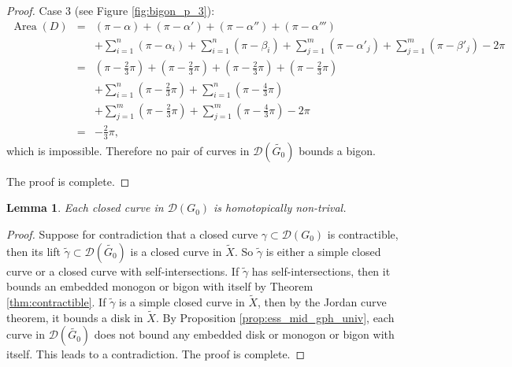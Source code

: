\documentclass[UTF8]{amsart}
\newtheorem{lemma}[theorem]{Lemma}
\numberwithin{equation}{section}
\theoremstyle{definition}
\theoremstyle{example}
\theoremstyle{remark}
\DeclareMathOperator{\area}{Area}
\begin{document}
\begin{proof}
	Case 3 (see Figure \ref{fig:bigon_p_3}):
	\begin{eqnarray*}
		\area(D) &=& (\pi-\alpha) + (\pi - \alpha') + (\pi - \alpha'') + (\pi - \alpha''') \\ 
			 & & + \sum_{i=1}^n ( \pi-\alpha_i ) + \sum_{i=1}^n ( \pi-\beta_i ) + \sum_{j=1}^m ( \pi-\alpha'_j ) + \sum_{j=1}^m ( \pi-\beta'_j ) -2\pi \\
			 &=& \left( \pi - \frac{2}{3}\pi \right) +  \left( \pi - \frac{2}{3}\pi \right) + \left( \pi - \frac{2}{3}\pi \right) + \left( \pi - \frac{2}{3}\pi \right) \\
			 & & + \sum_{i=1}^n \left( \pi - \frac{2}{3}\pi \right) + \sum_{i=1}^n \left( \pi - \frac{4}{3}\pi \right) \\
			 & &+ \sum_{j=1}^m \left( \pi - \frac{2}{3}\pi \right) + \sum_{j=1}^m \left( \pi - \frac{4}{3}\pi \right) - 2\pi \\
			 &=& - \frac{2}{3} \pi,
	\end{eqnarray*}
	which is impossible. Therefore no pair of curves in $\mathcal{D}(\widetilde{G_0})$ bounds a bigon. 

	The proof is complete. 
\end{proof}

\begin{lemma}
	Each closed curve in $\mathcal{D}(G_0)$ is homotopically non-trival. 
	\label{lem:mid_gph_incontractible}
\end{lemma}
\begin{proof}
	Suppose for contradiction that a closed curve $\gamma\subset \mathcal{D}(G_0)$ is contractible, then its lift $ \widetilde{\gamma} \subset \mathcal{D}( \widetilde{G_0})$ is a closed curve in $ \widetilde{X}$. So $ \widetilde{\gamma} $ is either a simple closed curve or a closed curve with self-intersections.  
	 If $ \widetilde{\gamma} $ has self-intersections, then it bounds an embedded monogon or bigon with itself by Theorem \ref{thm:contractible}. 
If $ \widetilde{\gamma} $ is a simple closed curve in $ \widetilde{X}$, then by the Jordan curve theorem, it bounds a disk in $ \widetilde{X}$.
	By Proposition \ref{prop:ess_mid_gph_univ}, each curve in $\mathcal{D}( \widetilde{G_0})$ does not bound any embedded disk or monogon or bigon with itself. This leads to a contradiction. 
	The proof is complete. 
\end{proof}
\end{document}
